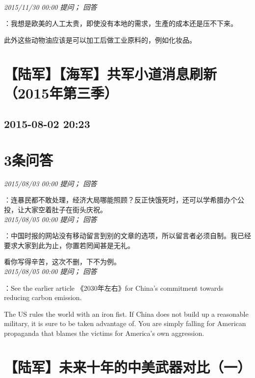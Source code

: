 \documentclass[twocolumn]{ctexart}
\begin{document}
\\

\textit{\hfill\noindent\small 2015/11/30 00:00 提问； 回答}

：我想是欧美的人工太贵，即使没有本地的需求，生產的成本还是压不下来。

此外这些动物油应该是可以加工后做工业原料的，例如化妆品。\\


\section{【陆军】【海军】共军小道消息刷新（2015年第三季）}
\subsection{2015-08-02 20:23}


\section{3条问答}

\textit{\hfill\noindent\small 2015/08/03 00:00 提问； 回答}

：连暴民都不敢处理，经济大局哪能照顾？反正快饿死时，还可以学希腊办个公投，让大家空着肚子在街头庆祝。\\

\textit{\hfill\noindent\small 2015/08/05 00:00 提问； 回答}

：中国时报的网站没有移动留言到别的文章的选项，所以留言者必须自制。我已经要求大家到此为止，你置若罔闻甚是无礼。

看你写得辛苦，这次不删，下不为例。\\

\textit{\hfill\noindent\small 2015/08/05 00:00 提问； 回答}

：See the earlier article 《2030年左右》for China's commitment towards reducing carbon emission.

The US rules the world with an iron fist. If China does not build up a reasonable military, it is sure to be taken advantage of. You are simply falling for American propaganda that blames the victims for America's own aggression.\\


\section{【陆军】未来十年的中美武器对比（一）}
\end{document}
